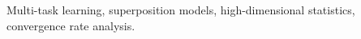 \documentclass[journal, twoside]{IEEEtran}
\begin{document}



\maketitle



\begin{IEEEkeywords}
Multi-task learning, superposition models, high-dimensional statistics, convergence rate analysis.
\end{IEEEkeywords}

\IEEEpeerreviewmaketitle









%
%
%
%
%


\ifCLASSOPTIONcaptionsoff
  \newpage
\fi




\newpage 
\onecolumn


%
%
%
%
%
%
\end{document}
